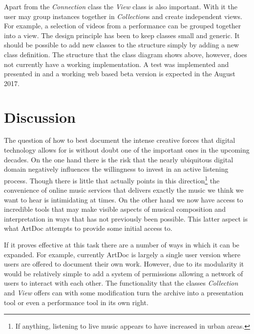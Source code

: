 \documentclass[runningheads,a4paper]{llncs}
\begin{document}
Apart from the \emph{Connection} class the \emph{View} class is also important. With it the user may group instances together in \emph{Collection}s and create independent views. For example, a selection of videos from a performance can be grouped together into a view.
The design principle has been to keep classes small and generic. It should be possible to add new classes to the structure simply by adding a new class definition. The structure that the class diagram shows above, however, does not currently have a working implementation. A test was implemented and presented in \cite{frisk08} and a working web based beta version is expected in the August 2017. 

\section{Discussion}
\label{sec:discussion}
The question of how to best document the intense creative forces that digital technology allows for is without doubt one of the important ones in the upcoming decades. On the one hand there is the risk that the nearly ubiquitous digital domain negatively influences the willingness to invest in an active listening process. Though there is little that actually points in this direction\footnote{If anything, listening to live music appears to have increased in urban areas.} the convenience of online music services that delivers exactly the music we think we want to hear is intimidating at times. On the other hand we now have access to incredible tools that may make visible aspects of musical composition and interpretation in ways that has not previously been possible. This latter aspect is what ArtDoc attempts to provide some initial access to. 

If it proves effective at this task there are a number of ways in which it can be expanded. For example, currently ArtDoc is largely a single user version where users are offered to document their own work. However, due to its modularity it would be relatively simple to add a system of permissions allowing a network of users to interact with each other. The functionality that the classes \emph{Collection} and \emph{View} offers can with some modification turn the archive into a presentation tool or even a performance tool in its own right.

\end{document}
